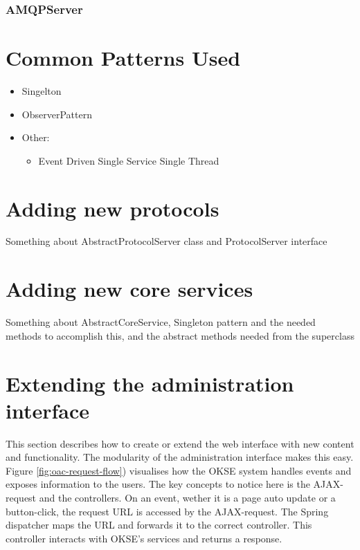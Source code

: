 \subsubsection{AMQPServer}

\section{Common Patterns Used}
\label{sec:common-patterns-used}

\begin{itemize}
\item Singelton
\item ObserverPattern
\item Other: \begin{itemize}
\item Event Driven Single Service Single Thread
\end{itemize}
\end{itemize}

\section{Adding new protocols}

Something about AbstractProtocolServer class and ProtocolServer interface

\section{Adding new core services}
\label{sec:adding-new-core-services}

Something about AbstractCoreService, Singleton pattern and the needed methods to accomplish this, and the abstract methods needed from the superclass

\section{Extending the administration interface}
\label{sec:adding-new-panes}

This section describes how to create or extend the web interface with new content and functionality. The modularity of the administration interface makes this easy. Figure \ref{fig:oac-request-flow}) visualises how the OKSE system handles events and exposes information to the users. The key concepts to notice here is the AJAX-request and the controllers. On an event, wether it is a page auto update or a button-click, the request URL is accessed by the AJAX-request. The Spring dispatcher maps the URL and forwards it to the correct controller. This controller interacts with OKSE's services and returns a response. 

